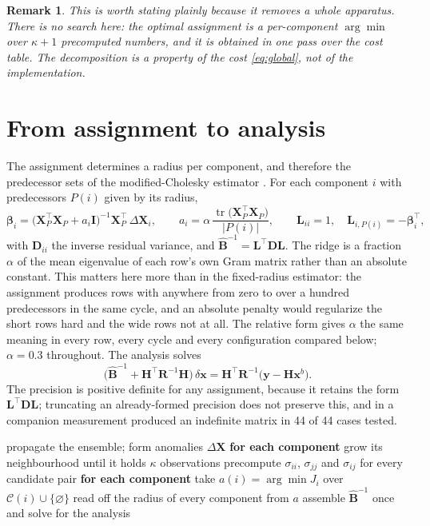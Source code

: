 \documentclass[11pt,a4paper]{article}
\newtheorem{remark}{Remark}
\newcommand{\xb}{\mathbf{x}^{b}}
\newcommand{\Bmat}{\mathbf{B}}
\newcommand{\Lmat}{\mathbf{L}}
\newcommand{\Dmat}{\mathbf{D}}
\newcommand{\Hmat}{\mathbf{H}}
\newcommand{\Rmat}{\mathbf{R}}
\begin{document}
\begin{remark}
This is worth stating plainly because it removes a whole apparatus. There is no
search here: the optimal assignment is a per-component $\arg\min$ over
$\kappa + 1$ precomputed numbers, and it is obtained in one pass over the cost
table. The decomposition is a property of the cost \eqref{eq:global}, not of
the implementation.
\end{remark}

\section{From assignment to analysis}

The assignment determines a radius per component, and therefore the predecessor
sets of the modified-Cholesky estimator \cite{bickel2008,nino2018}. For each
component $i$ with predecessors $P(i)$ given by its radius,
%
\begin{equation}
  \boldsymbol{\beta}_{i}
  = \big(\mathbf{X}_{P}^{\top}\mathbf{X}_{P} + a_{i}\mathbf{I}\big)^{-1}
    \mathbf{X}_{P}^{\top}\,\Delta\mathbf{X}_{i},
  \qquad a_{i} = \alpha\,\frac{\operatorname{tr}\big(\mathbf{X}_{P}^{\top}\mathbf{X}_{P}\big)}{|P(i)|},
  \qquad
  \Lmat_{ii} = 1, \quad \Lmat_{i,P(i)} = -\boldsymbol{\beta}_{i}^{\top},
\end{equation}
%
with $\Dmat_{ii}$ the inverse residual variance, and
$\widehat{\Bmat}^{-1} = \Lmat^{\top}\Dmat\Lmat$. The ridge is a fraction
$\alpha$ of the mean eigenvalue of each row's own Gram matrix rather than an
absolute constant. This matters here more than in the fixed-radius estimator:
the assignment produces rows with anywhere from zero to over a hundred
predecessors in the same cycle, and an absolute penalty would regularize the
short rows hard and the wide rows not at all. The relative form gives
$\alpha$ the same meaning in every row, every cycle and every configuration
compared below; $\alpha = 0.3$ throughout. The analysis solves
%
\begin{equation}
  \big(\widehat{\Bmat}^{-1} + \Hmat^{\top}\Rmat^{-1}\Hmat\big)\,
  \delta\mathbf{x} = \Hmat^{\top}\Rmat^{-1}\big(\mathbf{y} - \Hmat\xb\big).
\end{equation}
%
The precision is positive definite for any assignment, because it retains the
form $\Lmat^{\top}\Dmat\Lmat$; truncating an already-formed precision does not
preserve this, and in a companion measurement produced an indefinite matrix in
44 of 44 cases tested.

\begin{algorithm}[t]
\caption{One assimilation cycle}
\begin{algorithmic}[1]
\State propagate the ensemble; form anomalies $\Delta\mathbf{X}$
\State \textbf{for each component} grow its neighbourhood until it holds
       $\kappa$ observations
\State precompute $\sigma_{ii}$, $\sigma_{jj}$ and $\sigma_{ij}$ for every
       candidate pair
\State \textbf{for each component} take
       $a(i) = \arg\min J_{i}$ over $\mathcal{C}(i)\cup\{\varnothing\}$
\State read off the radius of every component from $a$
\State assemble $\widehat{\Bmat}^{-1}$ once and solve for the analysis
\end{algorithmic}
\end{algorithm}
\end{document}
